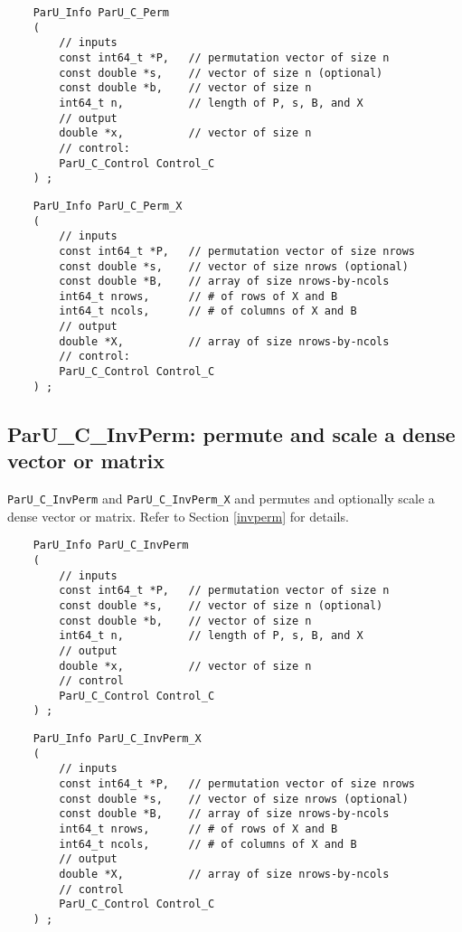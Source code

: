 \documentclass[12pt]{article}
\begin{document}
    {\footnotesize
    \begin{verbatim}
    ParU_Info ParU_C_Perm
    (
        // inputs
        const int64_t *P,   // permutation vector of size n
        const double *s,    // vector of size n (optional)
        const double *b,    // vector of size n
        int64_t n,          // length of P, s, B, and X
        // output
        double *x,          // vector of size n
        // control:
        ParU_C_Control Control_C
    ) ; \end{verbatim} }

    {\footnotesize
    \begin{verbatim}
    ParU_Info ParU_C_Perm_X
    (
        // inputs
        const int64_t *P,   // permutation vector of size nrows
        const double *s,    // vector of size nrows (optional)
        const double *B,    // array of size nrows-by-ncols
        int64_t nrows,      // # of rows of X and B
        int64_t ncols,      // # of columns of X and B
        // output
        double *X,          // array of size nrows-by-ncols
        // control:
        ParU_C_Control Control_C
    ) ; \end{verbatim} }

\subsection{{\sf ParU\_C\_InvPerm}: permute and scale a dense vector or matrix}

    \verb'ParU_C_InvPerm' and \verb'ParU_C_InvPerm_X' and permutes and
    optionally scale a dense vector or matrix.  Refer to Section \ref{invperm}
    for details.

    {\footnotesize
    \begin{verbatim}
    ParU_Info ParU_C_InvPerm
    (
        // inputs
        const int64_t *P,   // permutation vector of size n
        const double *s,    // vector of size n (optional)
        const double *b,    // vector of size n
        int64_t n,          // length of P, s, B, and X
        // output
        double *x,          // vector of size n
        // control
        ParU_C_Control Control_C
    ) ; \end{verbatim} }

    {\footnotesize
    \begin{verbatim}
    ParU_Info ParU_C_InvPerm_X
    (
        // inputs
        const int64_t *P,   // permutation vector of size nrows
        const double *s,    // vector of size nrows (optional)
        const double *B,    // array of size nrows-by-ncols
        int64_t nrows,      // # of rows of X and B
        int64_t ncols,      // # of columns of X and B
        // output
        double *X,          // array of size nrows-by-ncols
        // control
        ParU_C_Control Control_C
    ) ; \end{verbatim} }
\end{document}
